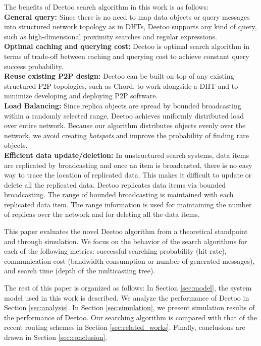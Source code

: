 \documentclass[conference]{IEEEtran}
\begin{document}
The benefits of Deetoo search algorithm in this work is as follows:\\ 
{\bf General query:} Since there is no need to map data objects or query 
messages into structured network topology as in DHTs, Deetoo supports
any kind of query, such as high-dimensional proximity searches and regular 
expressions.\\
{\bf Optimal caching and querying cost:} Deetoo is optimal search algorithm
in terms of trade-off between caching and querying cost to achieve 
constant query success probability.\\
{\bf Reuse existing P2P design:}
Deetoo can be built on top of any existing structured P2P topologies, such as
Chord, to work alongside a DHT and to minimize developing and deploying P2P 
software.\\
{\bf Load Balancing:} 
Since replica objects are spread by bounded broadcasting within 
a randomly selected range, Deetoo achieves uniformly distributed 
load over entire network. 
Because our algorithm distributes objects 
evenly over the network, we avoid creating \emph{hotspots} and improve 
the probability of finding rare objects.\\
{\bf Efficient data update/deletion:} In unstructured search systems, 
data items are replicated by broadcasting and once an item is broadcasted, 
there is no easy way to trace the location of replicated data. 
This makes it difficult to update or delete all the replicated data.
Deetoo replicates data items via bounded broadcasting. 
The range of bounded broadcasting is maintained with each replicated data item.  
The range information is used for maintaining
the number of replicas over the network and for deleting all the data items.

This paper evaluates the novel Deetoo algorithm from a theoretical 
standpoint and through simulation. 
We focus on the behavior of the search algorithms for each of the
following metrics: successful searching probability (hit rate),
communication cost (bandwidth consumption or number of
generated messages), and search time (depth of the multicasting tree). 

The rest of this paper is organized as follows: 
In Section \ref{sec:model}, the system model
used in this work is described. We analyze the performance of Deetoo in
Section \ref{sec:analysis}. In Section \ref{sec:simulation}, we present
simulation results of the performance of Deetoo. 
Our searching algorithm is compared with that of the recent routing 
schemes in Section \ref{sec:related_works}. 
Finally, conclusions are 
drawn in Section \ref{sec:conclusion}.
\end{document}
